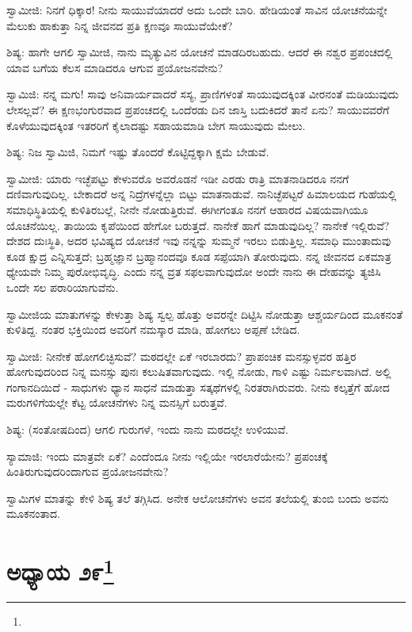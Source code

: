 ಸ್ವಾಮೀಜಿ: ನಿನಗೆ ಧಿಕ್ಕಾರ! ನೀನು ಸಾಯುವೆಯಾದರೆ ಅದು ಒಂದೇ ಬಾರಿ. ಹೇಡಿಯಂತೆ ಸಾವಿನ ಯೋಚನೆಯನ್ನೇ ಮೆಲುಕು ಹಾಕುತ್ತಾ ನಿನ್ನ ಜೀವನದ ಪ್ರತಿ ಕ್ಷಣವೂ ಸಾಯುವೆಯೇಕೆ?

ಶಿಷ್ಯ: ಹಾಗೇ ಆಗಲಿ ಸ್ವಾಮೀಜಿ, ನಾನು ಮೃತ್ಯುವಿನ ಯೋಚನೆ ಮಾಡದಿರಬಹುದು. ಆದರೆ ಈ ನಶ್ವರ ಪ್ರಪಂಚದಲ್ಲಿ ಯಾವ ಬಗೆಯ ಕೆಲಸ ಮಾಡಿದರೂ ಆಗುವ ಪ್ರಯೋಜನವೇನು?

ಸ್ವಾಮಿಜಿ: ನನ್ನ ಮಗು! ಸಾವು ಅನಿವಾರ್ಯವಾದರೆ ಸಸ್ಯ, ಪ್ರಾಣಿಗಳಂತೆ ಸಾಯುವುದಕ್ಕಿಂತ ವೀರನಂತೆ ಮಡಿಯುವುದು ಲೇಸಲ್ಲವೆ? ಈ ಕ್ಷಣಭಂಗುರವಾದ ಪ್ರಪಂಚದಲ್ಲಿ ಒಂದೆರಡು ದಿನ ಜಾಸ್ತಿ ಬದುಕಿದರೆ ತಾನೆ ಏನು? ಸಾಯುವವರೆಗೆ ಕೊಳೆಯುವುದಕ್ಕಿಂತ ಇತರರಿಗೆ ಕೈಲಾದಷ್ಟು ಸಹಾಯಮಾಡಿ ಬೇಗ ಸಾಯುವುದು ಮೇಲು.

ಶಿಷ್ಯ: ನಿಜ ಸ್ವಾಮಿಜಿ, ನಿಮಗೆ ಇಷ್ಟು ತೊಂದರೆ ಕೊಟ್ಟಿದ್ದಕ್ಕಾಗಿ ಕ್ಷಮೆ ಬೇಡುವೆ.

ಸ್ವಾಮೀಜಿ: ಯಾರು ಇಚ್ಛೆಪಟ್ಟು ಕೇಳುವರೊ ಅವರೊಡನೆ ಇಡೀ ಎರಡು ರಾತ್ರಿ ಮಾತನಾಡಿದರೂ ನನಗೆ ದಣಿವಾಗುವುದಿಲ್ಲ. ಬೇಕಾದರೆ ಅನ್ನ ನಿದ್ರೆಗಳನ್ನೆಲ್ಲಾ ಬಿಟ್ಟು ಮಾತನಾಡುವೆ. ನಾನಿಚ್ಛೆಪಟ್ಟರೆ ಹಿಮಾಲಯದ ಗುಹೆಯಲ್ಲಿ ಸಮಾಧಿಸ್ಥಿತಿಯಲ್ಲಿ ಕುಳಿತಿರಬಲ್ಲೆ, ನೀನೇ ನೋಡುತ್ತಿರುವೆ. ಈಗೀಗಂತೂ ನನಗೆ ಆಹಾರದ ವಿಷಯವಾಗಿಯೂ ಯೊಚನೆಯಿಲ್ಲ. ತಾಯಿಯ ಕೃಪೆಯಿಂದ ಹೇಗೋ ಬರುತ್ತದೆ. ನಾನೇಕೆ ಹಾಗೆ ಮಾಡುವುದಿಲ್ಲ? ನಾನೇಕೆ ಇಲ್ಲಿರುವೆ? ದೇಶದ ದುಃಸ್ಥಿತಿ, ಅದರ ಭವಿಷ್ಯದ ಯೋಚನೆ ಇವು ನನ್ನನ್ನು ಸುಮ್ಮನೆ ಇರಲು ಬಿಡುತ್ತಿಲ್ಲ. ಸಮಾಧಿ ಮುಂತಾದುವು ಕೂಡ ಕ್ಷುದ್ರ ಎನ್ನಿಸುತ್ತದೆ; ಬ್ರಹ್ಮಜ್ಞಾನ ಬ್ರಹ್ಮಾನಂದವೂ ಕೂಡ ಸಪ್ಪೆಯಾಗಿ ತೋರುವುದು. ನನ್ನ ಜೀವನದ ಏಕಮಾತ್ರ ಧ್ಯೇಯವೇ ನಿಮ್ಮ ಪುರೋಭಿವೃದ್ಧಿ. ಎಂದು ನನ್ನ ವ್ರತ ಸಫಲವಾಗುವುದೋ ಅಂದೇ ನಾನು ಈ ದೇಹವನ್ನು ತ್ಯಜಿಸಿ ಒಂದೇ ಸಲ ಪರಾರಿಯಾಗುವೆನು.

ಸ್ವಾಮೀಜಿಯ ಮಾತುಗಳನ್ನು ಕೇಳುತ್ತಾ ಶಿಷ್ಯ ಸ್ವಲ್ಪ ಹೊತ್ತು ಅವರನ್ನೇ ದಿಟ್ಟಿಸಿ ನೋಡುತ್ತಾ ಆಶ್ಚರ್ಯದಿಂದ ಮೂಕನಂತೆ ಕುಳಿತಿದ್ದ. ನಂತರ ಭಕ್ತಿಯಿಂದ ಅವರಿಗೆ ನಮಸ್ಕಾರ ಮಾಡಿ, ಹೋಗಲು ಅಪ್ಪಣೆ ಬೇಡಿದ.

ಸ್ವಾಮೀಜಿ: ನೀನೇಕೆ ಹೋಗಲಿಚ್ಛಿಸುವೆ? ಮಠದಲ್ಲೇ ಏಕೆ ಇರಬಾರದು? ಪ್ರಾಪಂಚಿಕ ಮನಸ್ಸುಳ್ಳವರ ಹತ್ತಿರ ಹೋಗುವುದರಿಂದ ನಿನ್ನ ಮನಸ್ಸು ಪುನಃ ಕಲುಷಿತವಾಗುವುದು. ಇಲ್ಲಿ ನೋಡು, ಗಾಳಿ ಎಷ್ಟು ನಿರ್ಮಲವಾಗಿದೆ. ಅಲ್ಲಿ ಗಂಗಾನದಿಯಿದೆ - ಸಾಧುಗಳು ಧ್ಯಾನ ಸಾಧನೆ ಮಾಡುತ್ತಾ ಸತ್ಕಥೆಗಳಲ್ಲಿ ನಿರತರಾಗಿರುವರು. ನೀನು ಕಲ್ಕತ್ತೆಗೆ ಹೋದ ಮರುಗಳಿಗೆಯಲ್ಲೇ ಕೆಟ್ಟ ಯೋಚನೆಗಳು ನಿನ್ನ ಮನಸ್ಸಿಗೆ ಬರುತ್ತವೆ.

ಶಿಷ್ಯ: (ಸಂತೋಷದಿಂದ) ಆಗಲಿ ಗುರುಗಳೆ, ಇಂದು ನಾನು ಮಠದಲ್ಲೇ ಉಳಿಯುವೆ.

ಸ್ಯಾಮಾಜಿ: ಇಂದು ಮಾತ್ರವೇ ಏಕೆ? ಎಂದೆಂದೂ ನೀನು ಇಲ್ಲಿಯೇ ಇರಲಾರೆಯೇನು? ಪ್ರಪಂಚಕ್ಕೆ ಹಿಂತಿರುಗುವುದರಿಂದಾಗುವ ಪ್ರಯೋಜನವೇನು?

ಸ್ವಾಮಿಗಳ ಮಾತನ್ನು ಕೇಳಿ ಶಿಷ್ಯ ತಲೆ ತಗ್ಗಿಸಿದ. ಅನೇಕ ಆಲೋಚನೆಗಳು ಅವನ ತಲೆಯಲ್ಲಿ ತುಂಬಿ ಬಂದು ಅವನು ಮೂಕನಂತಾದ.

\newpage

\chapter[ಅಧ್ಯಾಯ ೨೯]{ಅಧ್ಯಾಯ ೨೯\protect\footnote{}}

